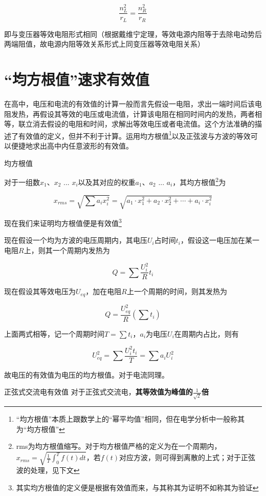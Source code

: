 $$\frac{n_L^2}{r_L} = \frac{n_R^2}{r_R}$$

即与变压器等效电阻形式相同（根据戴维宁定理，等效电源内阻等于去除电动势后两端阻值，故电源内阻等效关系形式上同变压器等效电阻关系）

\section{“均方根值”速求有效值}

在高中，电压和电流的有效值的计算一般而言先假设一电阻，求出一端时间后该电阻发热，再假设其等效的电压或电流值，计算该电阻在相同时间内的发热，两者相等，联立消去假设的电阻和时间，求解出等效电压或者电流值。这个方法准确的描述了有效值的定义，但并不利于计算。运用均方根值\footnote{“均方根值”本质上跟数学上的“幂平均值”相同，但在电学分析中一般称其为“均方根值”}以及正弦波与方波的等效可以便捷地求出高中内任意波形的有效值。

\begin{defi}{均方根值}{}

对于一组数$x_1$、$x_2$ ... $x_i$以及其对应的权重$a_1$、$a_2$ ... $a_i$，其均方根值\footnote{rms为均方根值缩写。对于均方根值严格的定义为在一个周期内，$x_{rms} = \sqrt{\frac{1}{T} \int_0^T f(t) dt}$，若$f(t)$对应方波，则可得到离散的上式；对于正弦波的处理，见下文}为

$$x_{rms} = \sqrt{\sum a_i x_i^2} = \sqrt{a_1 \cdot x_1^2 + a_2 \cdot x_2^2 + \cdots + a_i \cdot x_i^2}$$

\end{defi}

现在我们来证明均方根值便是有效值\footnote{其实均方根值的定义便是根据有效值而来，与其称其为证明不如称其为验证}

现在假设一个均为方波的电压周期内，其电压$U_i$占时间$t_i$，假设这一电压加在某一电阻$R$上，则其一个周期内发热为

$$ Q = \sum \frac{U_i^2}{R} t_i $$

现在假设其等效电压为$U_{eq}$，加在电阻$R$上一个周期的时间，则其发热为

$$ Q = \frac{U_{eq}^2}{R} (\sum t_i)$$

上面两式相等，记一个周期时间$T = \sum t_i $，$a_i$为电压$U_i$在周期内占比，则有
 
$$U_{eq}^2 = \sum \frac{U_i^2 t_i}{T} = \sum a_i U_i^2$$

故电压的有效值为电压的均方根值。对于电流同理。

\begin{theo}{正弦式交流电有效值}{}
对于正弦式交流电，\textbf{其等效值为峰值的$\frac{1}{\sqrt{2}}$倍}
\end{theo}

